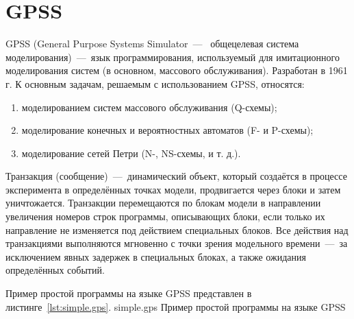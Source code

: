 \clearpage

\section{GPSS}

GPSS (General Purpose Systems Simulator~---~ общецелевая система моделирования)~---~язык программирования, используемый для имитационного моделирования систем (в основном, массового обслуживания).
Разработан в 1961 г.
К основным задачам, решаемым с использованием GPSS, относятся:
\begin{enumerate}
	\item моделированием систем массового обслуживания (Q-схемы);
	\item моделирование конечных и вероятностных автоматов (F- и P-схемы);
	\item моделирование сетей Петри (N-, NS-схемы, и т. д.).
\end{enumerate}

Транзакция (сообщение)~---~динамический объект, который создаётся в процессе эксперимента в определённых точках модели, продвигается через блоки и затем уничтожается.
Транзакции перемещаются по блокам модели в направлении увеличения номеров строк программы, описывающих блоки, если только их направление не изменяется под действием специальных блоков.
Все действия над транзакциями выполняются мгновенно с точки зрения модельного времени~---~за исключением явных задержек в специальных блоках, а также ожидания определённых событий.

Пример простой программы на языке GPSS представлен в листинге~\ref{lst:simple.gps}.
	{simple.gps}
	{Пример простой программы на языке GPSS}